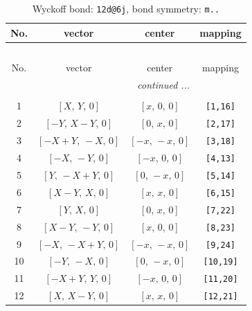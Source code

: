 \documentclass[fleqn,8pt]{jsarticle}
\begin{document}
\begin{longtable}{cccc}
\caption{Wyckoff bond: {\tt 12d@6j}, bond symmetry: {\tt m..}}
 \\
 \hline \hline
No. & vector & center & mapping \\ \hline \endfirsthead

\multicolumn{3}{l}{\tablename\ \thetable{}} \\
 \hline \hline
No. & vector & center & mapping \\ \hline \endhead

 \hline \hline
\multicolumn{3}{r}{\footnotesize\it continued ...} \\ \endfoot

 \hline \hline
\multicolumn{3}{r}{} \\ \endlastfoot

1 & $\left[ X,\, Y,\, 0 \right]$ & $\left[ x,\, 0,\, 0 \right]$ & {\tt [1,16]} \\ \hline
2 & $\left[ - Y,\, X - Y,\, 0 \right]$ & $\left[ 0,\, x,\, 0 \right]$ & {\tt [2,17]} \\ \hline
3 & $\left[ - X + Y,\, - X,\, 0 \right]$ & $\left[ - x,\, - x,\, 0 \right]$ & {\tt [3,18]} \\ \hline
4 & $\left[ - X,\, - Y,\, 0 \right]$ & $\left[ - x,\, 0,\, 0 \right]$ & {\tt [4,13]} \\ \hline
5 & $\left[ Y,\, - X + Y,\, 0 \right]$ & $\left[ 0,\, - x,\, 0 \right]$ & {\tt [5,14]} \\ \hline
6 & $\left[ X - Y,\, X,\, 0 \right]$ & $\left[ x,\, x,\, 0 \right]$ & {\tt [6,15]} \\ \hline
7 & $\left[ Y,\, X,\, 0 \right]$ & $\left[ 0,\, x,\, 0 \right]$ & {\tt [7,22]} \\ \hline
8 & $\left[ X - Y,\, - Y,\, 0 \right]$ & $\left[ x,\, 0,\, 0 \right]$ & {\tt [8,23]} \\ \hline
9 & $\left[ - X,\, - X + Y,\, 0 \right]$ & $\left[ - x,\, - x,\, 0 \right]$ & {\tt [9,24]} \\ \hline
10 & $\left[ - Y,\, - X,\, 0 \right]$ & $\left[ 0,\, - x,\, 0 \right]$ & {\tt [10,19]} \\ \hline
11 & $\left[ - X + Y,\, Y,\, 0 \right]$ & $\left[ - x,\, 0,\, 0 \right]$ & {\tt [11,20]} \\ \hline
12 & $\left[ X,\, X - Y,\, 0 \right]$ & $\left[ x,\, x,\, 0 \right]$ & {\tt [12,21]} \\
\end{longtable}
\renewcommand{\arraystretch}{1.2}
\end{document}
